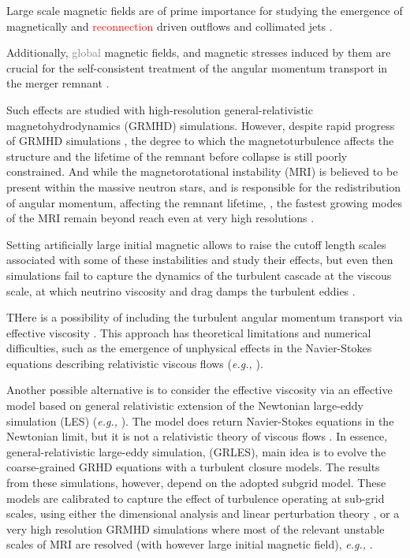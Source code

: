\documentclass[11pt,a4paper,headinclude=true,DIV=14,BCOR=8mm,chapterprefix,listof=totoc,twoside,openright,abstracton]{scrbook}
\newcommand{\red}[1]{\textcolor{red}{#1}}
\newcommand{\gray}[1]{\textcolor{gray}{#1}}
\begin{document}
Large scale magnetic fields are of prime importance for studying the emergence of magnetically and \red{reconnection} driven outflows and collimated jets \cite{Rezzolla:2011da,Bucciantini:2011kx,Siegel:2014ita,Ruiz:2016rai,Metzger:2018uni}.

Additionally, \gray{global} magnetic fields, and magnetic stresses induced by them are crucial for the self-consistent treatment of the angular momentum transport in the merger remnant \cite{Duez:2006qe,Kiuchi:2014hja,Guilet:2016sqd,Kiuchi:2017zzg}.

Such effects are studied with high-resolution general-relativistic magnetohydrodynamics (GRMHD) simulations. However, despite rapid progress of GRMHD simulations \cite{Rezzolla:2011da,Kiuchi:2014hja,Ruiz:2016rai},
the degree to which the magnetoturbulence affects the structure and the lifetime of the remnant 
before collapse is still poorly constrained.
And while the magnetorotational instability (MRI) \cite{Balbus:1991} is believed to be present within the 
massive neutron stars, and is responsible for the redistribution of angular momentum, affecting the 
remnant lifetime, \cite{Duez:2006qe,Siegel:2013nrw}, the fastest growing modes of the MRI remain beyond 
reach even at very high resolutions \cite{Kiuchi:2014hja}.

Setting artificially large initial magnetic allows to raise the cutoff length scales associated with some of these instabilities and study their effects, but even then simulations fail to capture the dynamics of the turbulent cascade at the viscous scale, at which neutrino viscosity and drag damps the turbulent eddies \cite{Guilet:2016sqd}. 

THere is a possibility of including the turbulent angular momentum transport via effective viscosity
\cite{Duez:2004nf}. 
This approach has theoretical limitations and numerical difficulties, such as the emergence of unphysical effects in the Navier-Stokes equations describing relativistic viscous flows (\textit{e.g.,} \cite{Hiscock:1985}).

Another possible alternative is to consider the effective viscosity via an effective model based on 
general relativistic extension of the Newtonian large-eddy simulation (LES) (\textit{e.g.,} \cite{Miesch:2015les}). The model does return Navier-Stokes equations in the Newtonian limit, but it is not a relativistic theory of viscous flows \cite{Radice:2017zta}.
In essence, general-relativistic large-eddy simulation, (GRLES), main idea is to evolve the coarse-grained GRHD equations with a turbulent closure models.
The results from these simulations, however, depend on the adopted subgrid model. 
These models are calibrated to capture the effect of turbulence operating at sub-grid scales,
using either the dimensional analysis and linear perturbation theory \cite{Radice:2017zta}, or a very high resolution GRMHD simulations where most of the relevant unstable scales of MRI are resolved (with however large initial magnetic field), \textit{e.g.,} \cite{Kiuchi:2017zzg}.
\end{document}

